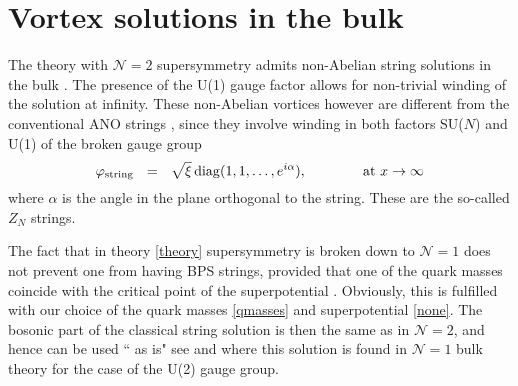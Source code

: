 \documentclass[12pt]{article}
\newcommand{\ntwo}{${\mathcal N}=2$ }
\newcommand{\ntwon}{${\mathcal N}=2$}
\newcommand{\none}{${\mathcal N}=1$ }
\begin{document}
%
%
\section{Vortex solutions in the bulk}
\label{vortex}
\setcounter{equation}{0}

	The theory with \ntwo supersymmetry admits non-Abelian string solutions in the bulk
\cite{HT1,ABEKY,SYmon,HT2}.
	The presence of the U(1) gauge factor allows for non-trivial winding of the solution
	at infinity.
	These non-Abelian vortices however are different from the conventional ANO strings \cite{ANO}, 
	since they involve winding in both factors SU($N$) and U(1) of the broken gauge group
\[
	\varphi_{\rm string} ~~=~~ \sqrt{\xi}\,{\rm diag}(1, 1, \dots, e^{i\alpha}), 
		\qquad\qquad \text{at $x \to \infty$}
\]
	where $ \alpha $ is the angle in the plane orthogonal to the string.
	These are the so-called $ Z_N $ strings.

	The fact that in theory \eqref{theory} supersymmetry is broken down to \none does not prevent
	one from having BPS strings, provided that one of the quark masses 
	coincide with the critical point of the superpotential \cite{Edalati}.
	Obviously, this is fulfilled with our choice of the quark masses \eqref{qmasses} and superpotential
	\eqref{none}.
	The bosonic part of the classical string solution is then the same as in \ntwon, and hence can
	be used `` as is"
	 see  \cite{SYrev} and \cite{SYhet} where this solution
is found in \none bulk theory for the case of the U(2) gauge group.
\end{document}

